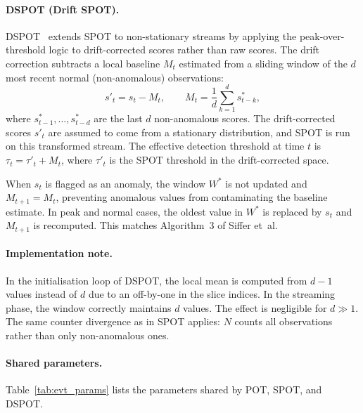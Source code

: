 \documentclass[11pt]{report}
\begin{document}
\paragraph{DSPOT (Drift SPOT).}
DSPOT~\cite{siffer:hal-01640325} extends SPOT to non-stationary streams by applying the peak-over-threshold logic to drift-corrected scores rather than raw scores. The drift correction subtracts a local baseline $M_t$ estimated from a sliding window of the $d$ most recent normal (non-anomalous) observations:
\begin{equation}
  \label{eq:dspot_drift}
  s'_t = s_t - M_t, \qquad M_t = \frac{1}{d}\sum_{k=1}^{d} s^*_{t-k},
\end{equation}
where $s^*_{t-1}, \ldots, s^*_{t-d}$ are the last $d$ non-anomalous scores. The drift-corrected scores $s'_t$ are assumed to come from a stationary distribution, and SPOT is run on this transformed stream. The effective detection threshold at time $t$ is $\tau_t = \tau'_t + M_t$, where $\tau'_t$ is the SPOT threshold in the drift-corrected space.

When $s_t$ is flagged as an anomaly, the window $W^*$ is not updated and $M_{t+1} = M_t$, preventing anomalous values from contaminating the baseline estimate. In peak and normal cases, the oldest value in $W^*$ is replaced by $s_t$ and $M_{t+1}$ is recomputed. This matches Algorithm~3 of Siffer et~al.

\paragraph{Implementation note.}
In the initialisation loop of DSPOT, the local mean is computed from $d - 1$ values instead of $d$ due to an off-by-one in the slice indices. In the streaming phase, the window correctly maintains $d$ values. The effect is negligible for $d \gg 1$. The same counter divergence as in SPOT applies: $N$ counts all observations rather than only non-anomalous ones.

\paragraph{Shared parameters.}
Table~\ref{tab:evt_params} lists the parameters shared by POT, SPOT, and DSPOT.
\end{document}
